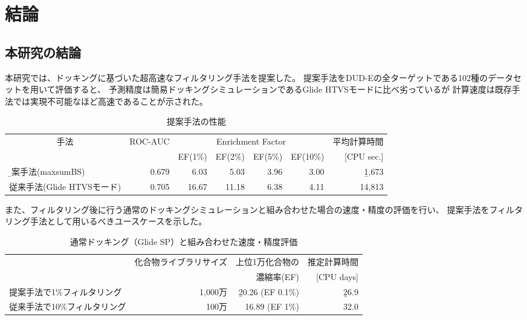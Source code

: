 \chapter{結論}
\section{本研究の結論}\label{sec:conclusion}
本研究では、ドッキングに基づいた超高速なフィルタリング手法を提案した。
提案手法をDUD-Eの全ターゲットである102種のデータセットを用いて評価すると、
予測精度は簡易ドッキングシミュレーションであるGlide HTVSモードに比べ劣っているが
計算速度は既存手法では実現不可能なほど高速であることが示された。
\begin{table}[h] \centering
	\caption{提案手法の性能}
	\label{table:conclusion_1}
	\begin{tabular}{l|rrrrrr}
	\hline
	\multicolumn{1}{c|}{\multirow{2}{*}{手法}}	&\multirow{2}{*}{ROC-AUC}	&\multicolumn{4}{c}{Enrichment Factor}	&平均計算時間	\\
										&						&EF(1\%)	&EF(2\%)	&EF(5\%)	&EF(10\%)	&[CPU sec.]		\\ \hline
	\b{提案手法(maxsumBS)}				&0.679					&6.03	&5.03	&3.96	&3.00		&\b{1,673}		\\
	従来手法(Glide HTVSモード)				&0.705				&16.67	&11.18	&6.38	&4.11		&14,813			\\ \hline
	\end{tabular}
\end{table}



また、フィルタリング後に行う通常のドッキングシミュレーションと組み合わせた場合の速度・精度の評価を行い、
提案手法をフィルタリング手法として用いるべきユースケースを示した。
\begin{table}[htbp] \centering
	\caption{通常ドッキング（Glide SP）と組み合わせた速度・精度評価}
	\label{table:conclusion_2}
	\begin{tabular}{l|rrr}
	\hline
												&\multirow{2}{*}{化合物ライブラリサイズ}	&上位1万化合物の		&推定計算時間	\\
												&														&濃縮率(EF)				&[CPU days]		\\ \hline
	提案手法で1\%フィルタリング		&1,000万											&\b{20.26 (EF 0.1\%)}		&\b{26.9}				\\
	従来手法で10\%フィルタリング	&100万												&16.89 (EF 1\%)			&32.0				\\ \hline
	\end{tabular}
\end{table}


